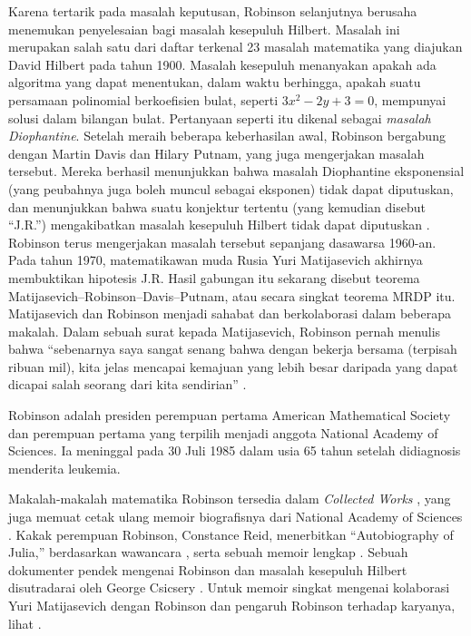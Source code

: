 \documentclass[../../../include/open-logic-section]{subfiles}
\begin{document}
Karena tertarik pada masalah keputusan, Robinson selanjutnya berusaha
menemukan penyelesaian bagi masalah kesepuluh Hilbert. Masalah ini merupakan
salah satu dari daftar terkenal 23 masalah matematika yang diajukan David
Hilbert pada tahun 1900. Masalah kesepuluh menanyakan apakah ada algoritma
yang dapat menentukan, dalam waktu berhingga, apakah suatu persamaan
polinomial berkoefisien bulat, seperti $3x^2 - 2y +3 = 0$, mempunyai solusi
dalam bilangan bulat. Pertanyaan seperti itu dikenal sebagai \emph{masalah
Diophantine}. Setelah meraih beberapa keberhasilan awal, Robinson bergabung
dengan Martin Davis dan Hilary Putnam, yang juga mengerjakan masalah
tersebut. Mereka berhasil menunjukkan bahwa masalah Diophantine eksponensial
(yang peubahnya juga boleh muncul sebagai eksponen) tidak dapat diputuskan,
dan menunjukkan bahwa suatu konjektur tertentu (yang kemudian disebut
``J.R.'') mengakibatkan masalah kesepuluh Hilbert tidak dapat diputuskan
\citep{DavisPutnamRobinson1961}. Robinson terus mengerjakan masalah tersebut
sepanjang dasawarsa 1960-an. Pada tahun 1970, matematikawan muda Rusia Yuri
Matijasevich akhirnya membuktikan hipotesis J.R. Hasil gabungan itu sekarang
disebut teorema Matijasevich--Robinson--Davis--Putnam, atau secara singkat
teorema MRDP itu. Matijasevich dan Robinson menjadi sahabat dan berkolaborasi dalam
beberapa makalah. Dalam sebuah surat kepada Matijasevich, Robinson pernah
menulis bahwa ``sebenarnya saya sangat senang bahwa dengan bekerja bersama
(terpisah ribuan mil), kita jelas mencapai kemajuan yang lebih besar daripada
yang dapat dicapai salah seorang dari kita sendirian''
\citep[45]{Matijasevich1992}.

Robinson adalah presiden perempuan pertama American Mathematical Society dan
perempuan pertama yang terpilih menjadi anggota National Academy of
Sciences. Ia meninggal pada 30 Juli 1985 dalam usia 65 tahun setelah
didiagnosis menderita leukemia.

\begin{reading}
Makalah-makalah matematika Robinson tersedia dalam \textit{Collected Works}
\citep{Robinson1996}, yang juga memuat cetak ulang memoir biografisnya dari
National Academy of Sciences \citep{Feferman1994}. Kakak perempuan Robinson,
Constance Reid, menerbitkan ``Autobiography of Julia,'' berdasarkan
wawancara \citep{Reid1986}, serta sebuah memoir lengkap
\citep{Reid1996}. Sebuah dokumenter pendek mengenai Robinson dan masalah
kesepuluh Hilbert disutradarai oleh George Csicsery \citep{Csicsery2016}.
Untuk memoir singkat mengenai kolaborasi Yuri Matijasevich dengan Robinson
dan pengaruh Robinson terhadap karyanya, lihat \citep{Matijasevich1992}.
\end{reading}
\end{document}
